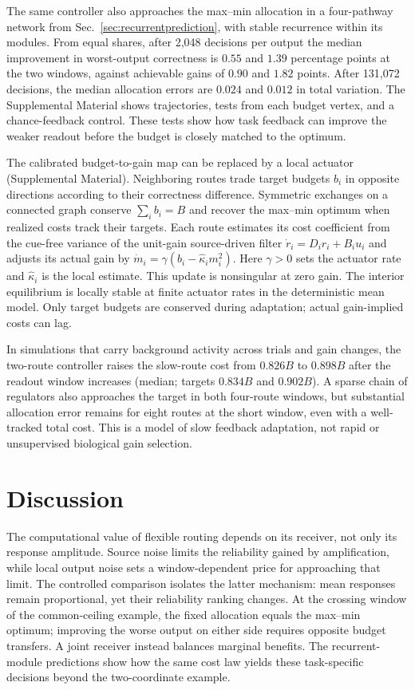 \documentclass[aps,10pt,onecolumn,superscriptaddress,nofootinbib,longbibliography,
  amsmath,amssymb,floatfix]{revtex4-2}
\begin{document}
The same controller also approaches the max--min allocation in a
four-pathway network from Sec.~\ref{sec:recurrentprediction}, with stable
recurrence within its modules. From equal shares, after 2,048
decisions per output the median improvement in worst-output
correctness is \(0.55\) and \(1.39\) percentage points at the two
windows, against achievable gains of \(0.90\) and \(1.82\) points.
After 131,072 decisions, the median allocation errors are \(0.024\)
and \(0.012\) in total variation. The Supplemental Material shows
trajectories, tests from each budget vertex, and a chance-feedback
control. These tests show how task feedback can improve the weaker
readout before the budget is closely matched to the optimum.

The calibrated budget-to-gain map can be replaced by a local
actuator (Supplemental Material). Neighboring routes trade target
budgets \(b_i\) in opposite directions according to their correctness
difference. Symmetric exchanges on a connected graph conserve
\(\sum_i b_i=B\) and recover the max--min optimum when realized
costs track their targets. Each route estimates its cost coefficient
from the cue-free variance of the unit-gain source-driven filter
\(\dot r_i=D_i r_i+B_i u_i\) and adjusts its actual gain by
\(\dot m_i=\gamma(b_i-\hat\kappa_i m_i^2)\). Here \(\gamma>0\)
sets the actuator rate and \(\hat\kappa_i\) is the local estimate.
This update is nonsingular at zero gain. The interior equilibrium
is locally stable at finite actuator rates in the deterministic
mean model. Only target budgets are conserved during adaptation;
actual gain-implied costs can lag.

In simulations that carry background activity across trials and
gain changes, the two-route controller raises the slow-route cost
from \(0.826B\) to \(0.898B\) after the readout window increases
(median; targets \(0.834B\) and \(0.902B\)). A sparse chain of
regulators also approaches the target in both four-route windows,
but substantial allocation error remains for eight routes at the
short window, even with a well-tracked total cost. This is a model
of slow feedback adaptation, not rapid or unsupervised biological
gain selection.
\FloatBarrier

\section{Discussion}

The computational value of flexible routing depends on its receiver,
not only its response amplitude. Source noise limits the reliability
gained by amplification, while local output noise sets a
window-dependent price for approaching that limit. The controlled
comparison isolates the latter mechanism: mean responses remain
proportional, yet their reliability ranking changes. At the crossing
window of the common-ceiling example, the fixed allocation equals
the max--min optimum; improving the worse output on either side
requires opposite budget transfers. A joint receiver instead
balances marginal benefits. The recurrent-module predictions show
how the same cost law yields these task-specific decisions beyond
the two-coordinate example.
\end{document}
